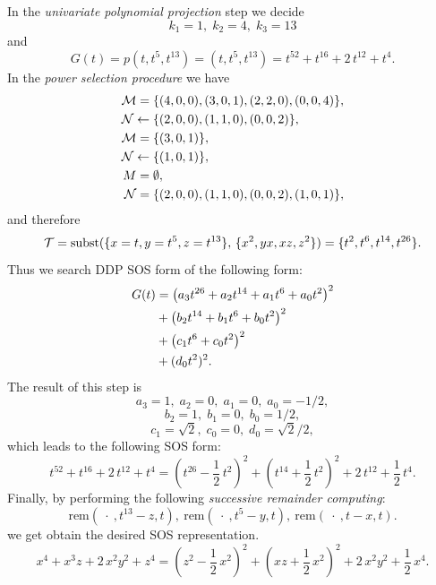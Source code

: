 \documentclass[runningheads]{llncs}
\begin{document}
{In the {\it univariate polynomial projection} step we decide
$$
k_1=1, \; k_2=4, \; k_3=13
$$
and
$$
G(t)=p(t,t^5,t^{13})=
(t,t^5,t^{13})={t}^{52}+{t}^{16}+2\,{t}^{12}+{t}^{4}. 
$$
In the {\it power selection procedure\/} we have
\begin{align*}
    {\cal M}=&\;\{(4,0,0),(3,0,1),(2,2,0),(0,0,4)\},\\
    {\cal N}\leftarrow &\;\{(2,0,0),(1,1,0),(0,0,2)\},\\
    {\cal M}=&\;\{(3,0,1)\},\\
    {\cal N}\leftarrow&\; \{(1,0,1)\},\\
    M=&\;\emptyset,\\
    {\cal N}=&\;\{(2,0,0),(1,1,0),(0,0,2),(1,0,1)\},
\end{align*}
and therefore 
$$
{\cal T}=\text{subst}(\{x=t,y=t^5,z=t^{13}\},\,
\{{x}^{2},yx,xz,{z}^{2}\})=\{{t}^{2},{t}^{6},{t}^{14},{t}^{26}\}.
$$
Thus we search DDP SOS form of the following form:
\begin{align}%
  G(t) &= \left( a_{{3}}{t}^{26}+a_{{2}}{t}^{14}+a_{{1}}{t}^{6}+a_{{0}}{t}^{2}
 \right) ^{2}\notag\\
 &+ \left( b_{{2}}{t}^{14}+b_{{1}}{t}^{6}+b_{{0}}{t}^{2}
 \right) ^{2}\notag\\
 &+ \left( c_{{1}}{t}^{6}+c_{{0}}{t}^{2} \right) ^{2}\notag\\
  &+({d_{{0}}}{t}^{2})^2.\notag
\end{align}
The result of this step is
$$
a_3=1,\; a_2=0,\; a_1=0,\; a_0=-1/2,
$$
$$
b_2=1,\; b_1=0,\; b_0=1/2,
$$
$$
c_1=\sqrt{2},\; c_0=0,\; d_0=\sqrt{2}/2,
$$
which leads to the following SOS form:
\begin{equation}\label{eq-000013}
{t}^{52}+{t}^{16}+2\,{t}^{12}+{t}^{4}=\left( {t}^{26}-\frac{1}{2}\,{t}^{2} \right) ^{2}+ \left( {t}^{14}+\frac{1}{2}\,{t}^{
2} \right) ^{2}+2\,{t}^{12}+\frac{1}{2}\,{t}^{4}.
\end{equation}
Finally, by performing the following {\it successive remainder computing\/}: 
$$
\mathrm{rem}(~\cdot~,t^{13}-z,t),~\mathrm{rem}(~\cdot~,t^{5}-y,t), ~\mathrm{rem}(~\cdot~,t-x,t).
$$
we get obtain the desired SOS representation.
\begin{equation}\label{eq-000015}
{x}^{4}+{x}^{3}z+2\,{x}^{2}{y}^{2}+{z}^{4}=\left( {z}^{2}-\frac{1}{2}\,{x}^{2}
 \right) ^{2}+ \left( xz+\frac{1}{2}\,{x}^{2} \right) ^{2}+2\,{x}^{2}{y}^
{2}+ \frac{1}{2}\,{x}^{4}.
\end{equation}

}
\end{document}
